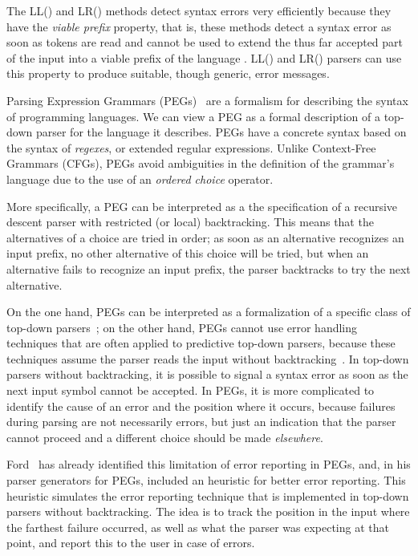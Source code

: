 \documentclass[3p,12pt,singlecolumn]{elsarticle}
\begin{document}
The LL() and LR() methods detect syntax errors very efficiently
because they have the \emph{viable prefix} property, that is,
these methods detect a syntax error as soon as  tokens are read
and cannot be used to extend the thus far accepted part of the input
into a viable prefix of the language
\cite{aho2006cpt}. LL() and LR() parsers can use this
property to produce suitable, though generic, error
messages.

Parsing Expression Grammars (PEGs)~\cite{ford2004peg} are a
formalism for describing the syntax of programming languages.
We can view a PEG as a formal description of a top-down parser
for the language it describes. PEGs have a concrete syntax based on
the syntax of {\em regexes}, or extended regular expressions.
Unlike Context-Free Grammars (CFGs),
PEGs avoid ambiguities in the definition of the grammar's
language due to the use of an {\em ordered choice} operator.

More specifically, a PEG can be interpreted as a the specification
of a recursive
descent parser with restricted (or local) backtracking.
This means that the alternatives of a choice are tried in
order; as soon as an alternative recognizes an input prefix,
no other alternative of this choice will be tried, but when an
alternative fails to recognize an input prefix, the parser
backtracks to try the next alternative.

On the one hand, PEGs can be interpreted as a formalization of a
specific class of top-down parsers~\cite{ford2004peg}; on the other hand,
PEGs cannot use error handling techniques that are often applied
to predictive top-down parsers, because these techniques assume the parser
reads the input without backtracking~\cite{ford2002packrat}.
In top-down parsers without backtracking, it is possible to
signal a syntax error as soon as the next input symbol cannot be accepted.
In PEGs, it is more complicated to identify the cause
of an error and the position where it occurs, because failures
during parsing are not necessarily errors, but just an
indication that the parser cannot proceed and a different
choice should be made \emph{elsewhere}.

Ford~\cite{ford2002packrat} has already identified this
limitation of error reporting in PEGs, and, in his
parser generators for PEGs, included an heuristic for
better error reporting. This heuristic simulates the error
reporting technique that is implemented in top-down parsers
without backtracking. The idea is to track the position
in the input where the farthest failure occurred, as
well as what the parser was expecting
at that point, and report this to the user in case of errors.
\end{document}
